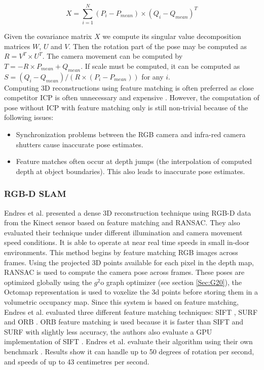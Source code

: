 \begin{equation} \label{eqn:CovarMatForFMRansac}
X = \sum_{i=1}^{N} (P_i - P_{mean}) \times (Q_i - Q_{mean})^T
\end{equation}

Given the covariance matrix $X$ we compute its singular value decomposition matrices $W$, $U$ and $V$. Then the rotation part of the pose may be computed as $R = V^T \times U^T$. The camera movement can be computed by $T = -R \times P_{mean} + Q_{mean}$. If scale must be computed, it can be computed as $S = (Q_i - Q_{mean}) / (R \times(P_i - P_{mean}))$ for any $i$. \\

Computing 3D reconstructions using feature matching is often preferred as close competitor ICP is often unnecessary and expensive \cite{Endres12Evaluation}. However, the computation of pose without ICP with feature matching only is still non-trivial because of the following issues:


\begin{itemize}
\item Synchronization problems between the RGB camera and infra-red camera shutters cause inaccurate pose estimates. 
\item Feature matches often occur at depth jumps (the interpolation of computed depth at object boundaries). This also leads to inaccurate pose estimates.
\end{itemize}


\subsubsection{RGB-D SLAM}

Endres et al. \cite{Endres12Evaluation} presented a dense 3D reconstruction technique using RGB-D data from the Kinect sensor based on feature matching and RANSAC. They also evaluated their technique under different illumination and camera movement speed conditions. It is able to operate at near real time speeds in small in-door environments. This method begins by feature matching RGB images across frames. Using the projected 3D points available for each pixel in the depth map, RANSAC \cite{Fischler81Random,Huttenlocher91Fast} is used to compute the camera pose across frames. These poses are optimized globally using the $g^2$o graph optimizer (see section \ref{Sec:G20}), the Octomap representation \cite{Wurm10Octomap} is used to voxelize the 3d points before storing them in a volumetric occupancy map. Since this system is based on feature matching, Endres et al. evaluated three different feature matching techniques: SIFT \cite{Lowe04Distinctive} , SURF \cite{Bay06Surf,Bay08Speeded} and ORB \cite{Rublee11Orb}. ORB feature matching is used because it is faster than SIFT and SURF with slightly less accuracy, the authors also evaluate a GPU implementation of SIFT \cite{Wu07Siftgpu}. Endres et al. evaluate their algorithm using their own benchmark \cite{Sturm11Towards}. Results show it can handle up to 50 degrees of rotation per second, and speeds of up to 43 centimetres per second.  \\


